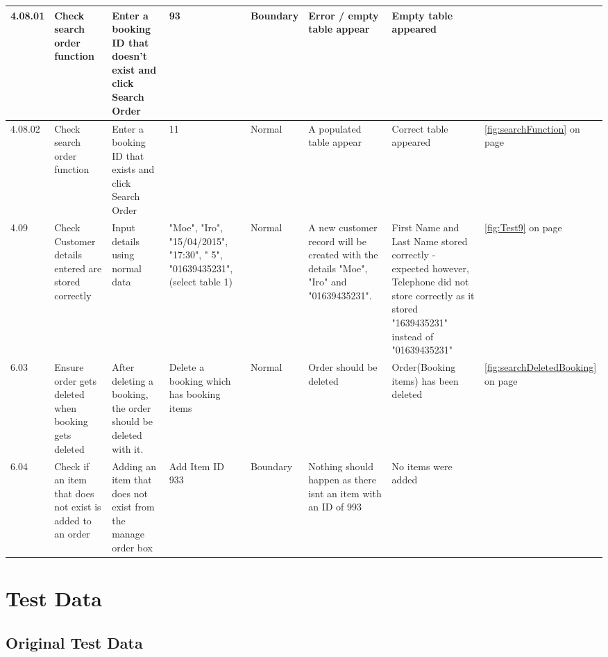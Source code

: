 \begin{landscape}
\begin{center}
\begin{longtable}{|p{1.5cm}|p{2.5cm}|p{2.5cm}|p{2cm}|p{2cm}|p{2cm}|p{2cm}|p{2cm}|}
           4.08.01 & Check search order function & Enter a booking ID that doesn't exist and click Search Order & 93 &  Boundary &  Error / empty table appear &  Empty table appeared  &  \\ \hline
           4.08.02& Check search order function & Enter a booking ID that exists and click Search Order & 11 &  Normal &  A populated table appear & Correct table appeared   & \ref{fig:searchFunction} on page \pageref{fig:searchFunction} \\ \hline
	4.09 & Check Customer details entered are stored correctly & Input details using normal data & "Moe", "Iro", "15/04/2015", "17:30", " 5", "01639435231", (select table 1)  & Normal & A new customer record will be created with the details "Moe", "Iro" and "01639435231". & First Name and Last Name stored correctly - expected however, Telephone did not store correctly as it stored "1639435231" instead of "01639435231" &  \ref{fig:Test9} on page \pageref{fig:Test9}\\ \hline
	6.03 & Ensure order gets deleted when booking gets deleted & After deleting a booking, the order should be deleted with it.  & Delete a booking which has booking items   & Normal & Order should be deleted &Order(Booking items) has been deleted &\ref{fig:searchDeletedBooking} on page \pageref{fig:searchDeletedBooking} \\ \hline
	6.04 & Check if an item that does not exist is added to an order & Adding an item that does not exist from the manage order box  & Add Item ID 933 & Boundary & Nothing should happen as there isnt an item with an ID of 993 & No items were added& \\ \hline
	


    \end{longtable}
\end{center}
\end{landscape}

\section{Test Data}

\subsection{Original Test Data}

